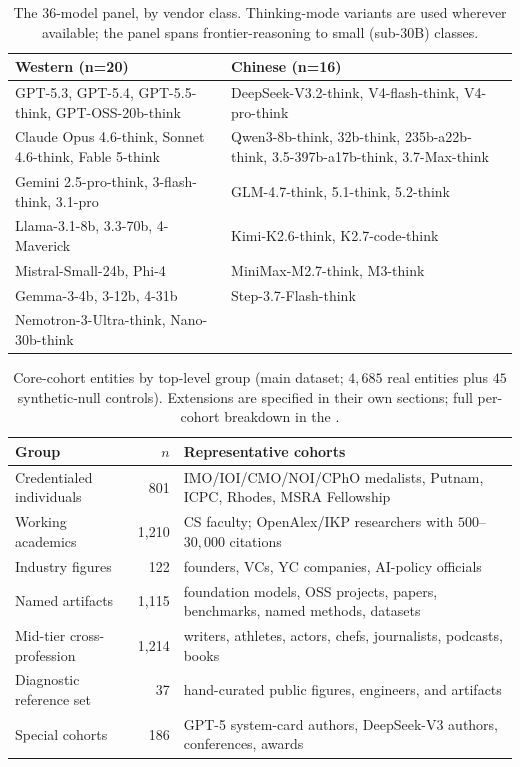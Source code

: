 \begin{table}[!htbp]
\centering
\footnotesize
\caption{The $36$-model panel, by vendor class. Thinking-mode variants are used wherever available; the panel spans frontier-reasoning to small (sub-$30$B) classes.}
\label{tab:panel}
\begin{tabularx}{\textwidth}{XX}
\toprule
\textbf{Western (n=20)} & \textbf{Chinese (n=16)} \\
\midrule
GPT-5.3, GPT-5.4, GPT-5.5-think, GPT-OSS-20b-think & DeepSeek-V3.2-think, V4-flash-think, V4-pro-think \\
Claude Opus 4.6-think, Sonnet 4.6-think, Fable 5-think & Qwen3-8b-think, 32b-think, 235b-a22b-think, 3.5-397b-a17b-think, 3.7-Max-think \\
Gemini 2.5-pro-think, 3-flash-think, 3.1-pro & GLM-4.7-think, 5.1-think, 5.2-think \\
Llama-3.1-8b, 3.3-70b, 4-Maverick & Kimi-K2.6-think, K2.7-code-think \\
Mistral-Small-24b, Phi-4 & MiniMax-M2.7-think, M3-think \\
Gemma-3-4b, 3-12b, 4-31b & Step-3.7-Flash-think \\
Nemotron-3-Ultra-think, Nano-30b-think & \\
\bottomrule
\end{tabularx}
\end{table}

\begin{table}[!htbp]
\centering
\small
\caption{Core-cohort entities by top-level group (main dataset; $4{,}685$ real entities plus $45$ synthetic-null controls). Extensions are specified in their own sections; full per-cohort breakdown in the .}
\label{tab:cohort-groups}
\begin{tabularx}{\textwidth}{lrX}
\toprule
Group & $n$ & Representative cohorts \\
\midrule
Credentialed individuals & 801 & IMO/IOI/CMO/NOI/CPhO medalists, Putnam, ICPC, Rhodes, MSRA Fellowship \\
Working academics & 1{,}210 & CS faculty; OpenAlex/IKP researchers with $500$--$30{,}000$ citations \\
Industry figures & 122 & founders, VCs, YC companies, AI-policy officials \\
Named artifacts & 1{,}115 & foundation models, OSS projects, papers, benchmarks, named methods, datasets \\
Mid-tier cross-profession & 1{,}214 & writers, athletes, actors, chefs, journalists, podcasts, books \\
Diagnostic reference set & 37 & hand-curated public figures, engineers, and artifacts \\
Special cohorts & 186 & GPT-5 system-card authors, DeepSeek-V3 authors, conferences, awards \\
\bottomrule
\end{tabularx}
\end{table}

